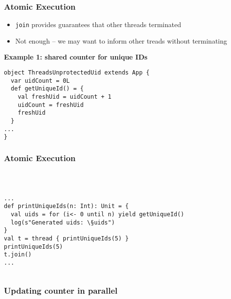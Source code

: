 \documentclass[aspectratio=169]{beamer}
\begin{document}
\begin{frame}[fragile]\frametitle{Atomic Execution}
\begin{itemize}
  \item \texttt{join} provides guarantees that other threads terminated
  \item Not enough -- we may want to inform other treads without terminating
\end{itemize}

\textbf{Example 1: shared counter for unique IDs}
\begin{lstlisting}[emph={sleep,log,thread,join}]
object ThreadsUnprotectedUid extends App {
  var uidCount = 0L
  def getUniqueId() = {
    val freshUid = uidCount + 1
    uidCount = freshUid
    freshUid
  }
...
}
\end{lstlisting}

\end{frame}


\begin{frame}[fragile]\frametitle{Atomic Execution}
~\\[-8mm]
\begin{columns}
\begin{column}{0.49\textwidth}
\begin{lstlisting}[emph={printUniqueIds,sleep,log,thread,join}]
...
def printUniqueIds(n: Int): Unit = {
  val uids = for (i<- 0 until n) yield getUniqueId()
  log(s"Generated uids: \§uids")
}
val t = thread { printUniqueIds(5) }
printUniqueIds(5)
t.join()
...
\end{lstlisting}
\end{column}
\end{columns}
%
\end{frame}

\begin{frame}\frametitle{Updating counter in parallel}
  \centering

  \medskip
  
\end{frame}
\end{document}
